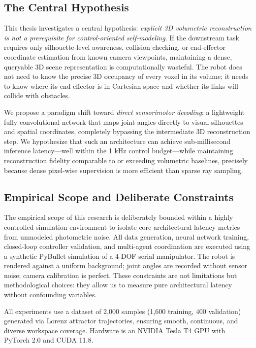 ﻿\documentclass[12pt,a4paper,oneside]{report}
\begin{document}
\subsection{The Central Hypothesis}

This thesis investigates a central hypothesis: \textit{explicit 3D volumetric reconstruction is not a prerequisite for control-oriented self-modeling}. If the downstream task requires only silhouette-level awareness, collision checking, or end-effector coordinate estimation from known camera viewpoints, maintaining a dense, queryable 3D scene representation is computationally wasteful. The robot does not need to know the precise 3D occupancy of every voxel in its volume; it needs to know where its end-effector is in Cartesian space and whether its links will collide with obstacles.

We propose a paradigm shift toward \textit{direct sensorimotor decoding}: a lightweight fully convolutional network that maps joint angles directly to visual silhouettes and spatial coordinates, completely bypassing the intermediate 3D reconstruction step. We hypothesize that such an architecture can achieve sub-millisecond inference latency---well within the 1 kHz control budget---while maintaining reconstruction fidelity comparable to or exceeding volumetric baselines, precisely because dense pixel-wise supervision is more efficient than sparse ray sampling.

\subsection{Empirical Scope and Deliberate Constraints}

The empirical scope of this research is deliberately bounded within a highly controlled simulation environment to isolate core architectural latency metrics from unmodeled photometric noise. All data generation, neural network training, closed-loop controller validation, and multi-agent coordination are executed using a synthetic PyBullet simulation of a 4-DOF serial manipulator. The robot is rendered against a uniform background; joint angles are recorded without sensor noise; camera calibration is perfect. These constraints are not limitations but methodological choices: they allow us to measure pure architectural latency without confounding variables.

All experiments use a dataset of 2,000 samples (1,600 training, 400 validation) generated via Lorenz attractor trajectories, ensuring smooth, continuous, and diverse workspace coverage. Hardware is an NVIDIA Tesla T4 GPU with PyTorch 2.0 and CUDA 11.8.
\end{document}
